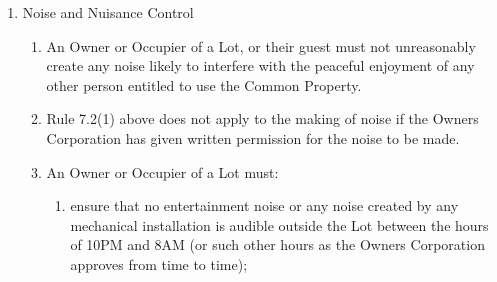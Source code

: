 \documentclass{article}
\begin{document}
\begin{enumerate}[label=\arabic*.]
\begin{enumerate}[label=\arabic{enumi}.\arabic*.]
\begin{enumerate}[label=\arabic{enumi}.\arabic*.]
\begin{enumerate}[label=(\arabic*)]
\begin{enumerate}[label=(\alph*)]
\item  not hold parties or gatherings on the Common Property unless the Owners Corporation first consent in writing;

\item  not consume alcohol on Common Property without first obtaining the written consent of the Owners Corporation;

\item  not take glassware in any Common Property areas;

\item  not smoke on any Common Property area;

\item  not use skateboards, scooters, roller skates, roller blades or similar forms of recreation transport on the Common Property; and

\item  ensure that any child or minor over whom the Lot Owner or Occupier has care, responsibility or control is at all times accompanied by them whilst on Common Property.

\end{enumerate}

\end{enumerate}

\item  Noise and Nuisance Control

\begin{enumerate}[label=(\arabic*)]

\item  An Owner or Occupier of a Lot, or their guest must not unreasonably create any noise likely to interfere with the peaceful enjoyment of any other person entitled to use the Common Property.

\item  Rule 7.2(1) above does not apply to the making of noise if the Owners Corporation has given written permission for the noise to be made.

\item  An Owner or Occupier of a Lot must:

\begin{enumerate}[label=(\alph*)]

\item  ensure that no entertainment noise or any noise created by any mechanical installation is audible outside the Lot between the hours of 10PM and 8AM (or such other hours as the Owners Corporation approves from time to time);


\end{enumerate}
\end{enumerate}
\end{enumerate}
\end{enumerate}
\end{enumerate}
\end{document}
